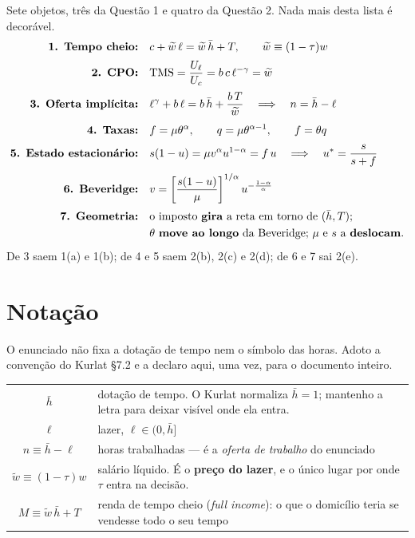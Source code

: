 \documentclass[11pt, a4paper]{article}
\newcommand{\stst}{^{\ast}}
\newcommand{\wt}{\widetilde{w}}
\begin{document}
\begin{tcolorbox}[planbox, title={O que você precisa saber de cor ao entrar na prova}]
\small
Sete objetos, três da Questão 1 e quatro da Questão 2. Nada mais desta lista é decorável.
\begin{align*}
\text{\textbf{1. Tempo cheio:}}\quad & c + \wt\,\ell = \wt\,\bar h + T,
  \qquad \wt \equiv (1-\tau)w \\[2pt]
\text{\textbf{2. CPO:}}\quad & \mathrm{TMS} = \frac{U_\ell}{U_c} = b\,c\,\ell^{-\gamma} = \wt \\[2pt]
\text{\textbf{3. Oferta implícita:}}\quad & \ell^{\gamma} + b\,\ell
  = b\,\bar h + \frac{b\,T}{\wt}
  \quad\Longrightarrow\quad n = \bar h - \ell \\[4pt]
\text{\textbf{4. Taxas:}}\quad & f = \mu\theta^{\alpha}, \qquad q = \mu\theta^{\alpha-1},
  \qquad f = \theta q \\[2pt]
\text{\textbf{5. Estado estacionário:}}\quad & s(1-u) = \mu v^{\alpha}u^{1-\alpha} = f\,u
  \quad\Longrightarrow\quad u\stst = \frac{s}{s+f} \\[2pt]
\text{\textbf{6. Beveridge:}}\quad & v = \left[\frac{s(1-u)}{\mu}\right]^{1/\alpha}
  u^{-\frac{1-\alpha}{\alpha}} \\[2pt]
\text{\textbf{7. Geometria:}}\quad & \text{o imposto \textbf{gira} a reta em torno de }
  (\bar h, T);\\
  & \theta \text{ \textbf{move ao longo} da Beveridge;\ } \mu \text{ e } s
  \text{ a \textbf{deslocam}.}
\end{align*}
De 3 saem 1(a) e 1(b); de 4 e 5 saem 2(b), 2(c) e 2(d); de 6 e 7 sai 2(e).
\end{tcolorbox}
\label{sec:fimplano}

\section[Notação]{Notação}
\label{sec:notacao}

O enunciado não fixa a dotação de tempo nem o símbolo das horas. Adoto a convenção do
Kurlat §7.2 e a declaro aqui, uma vez, para o documento inteiro.

\begin{center}
\small
\begin{tabular}{@{}cp{12.6cm}@{}}
\toprule
$\bar h$ & dotação de tempo. O Kurlat normaliza $\bar h = 1$; mantenho a letra para
  deixar visível onde ela entra. \\
$\ell$ & lazer, $\ell \in (0,\bar h]$ \\
$n \equiv \bar h - \ell$ & horas trabalhadas --- é a \emph{oferta de trabalho} do
  enunciado \\
$\wt \equiv (1-\tau)w$ & salário líquido. É o \textbf{preço do lazer}, e o único
  lugar por onde $\tau$ entra na decisão. \\
$M \equiv \wt\,\bar h + T$ & renda de tempo cheio (\emph{full income}): o que o domicílio
  teria se vendesse todo o seu tempo \\
\bottomrule
\end{tabular}
\end{center}
\end{document}
